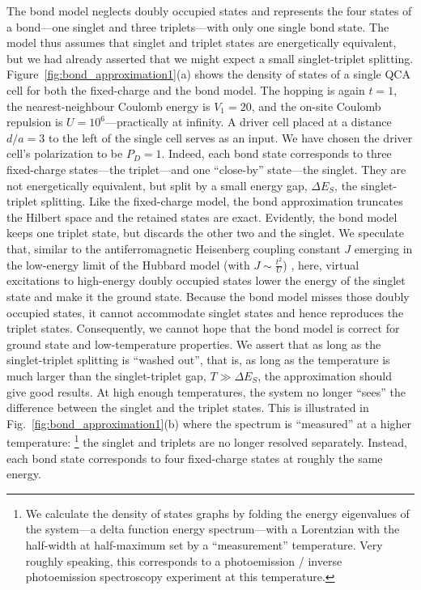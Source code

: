 The bond model neglects doubly occupied states and represents the four states of
a bond---one singlet and three triplets---with only one single bond state. The
model thus assumes that singlet and triplet states are energetically equivalent,
but we had already asserted that we might expect a small singlet-triplet
splitting. Figure~\ref{fig:bond_approximation1}(a) shows the density of states of
a single QCA cell for both the fixed-charge and the bond model. The hopping is
again $t=1$, the nearest-neighbour Coulomb energy is $V_1 = 20$, and the on-site
Coulomb repulsion is $U = 10^6$---practically at infinity. A driver cell placed
at a distance $d/a = 3$ to the left of the single cell serves as an input. We have
chosen the driver cell's polarization to be $P_D = 1$. Indeed, each bond state
corresponds to three fixed-charge states---the triplet---and one ``close-by''
state---the singlet. They are not energetically equivalent, but split by a small
energy gap, $\Delta E_S$, the singlet-triplet splitting. Like the fixed-charge
model, the bond approximation truncates the Hilbert space and the retained
states are exact. Evidently, the bond model keeps one triplet state, but
discards the other two and the singlet. We speculate that, similar to the
antiferromagnetic Heisenberg coupling constant $J$ emerging in the low-energy
limit of the Hubbard model (with $J \sim \frac{t^2}{U}$) \cite{Auerbach}, here,
virtual excitations to high-energy doubly occupied states lower the energy of
the singlet state and make it the ground state. Because the bond model misses
those doubly occupied states, it cannot accommodate singlet states and hence
reproduces the triplet states. Consequently, we cannot hope that the bond model
is correct for ground state and low-temperature properties. We assert that as
long as the singlet-triplet splitting is ``washed out'', that is, as long as the
temperature is much larger than the singlet-triplet gap, $T \gg \Delta E_S$, the
approximation should give good results. At high enough temperatures, the system
no longer ``sees'' the difference between the singlet and the triplet states.
This is illustrated in Fig.~\ref{fig:bond_approximation1}(b) where the spectrum
is ``measured'' at a higher temperature:%
%
\footnote{
We calculate the density of states graphs by folding the energy
eigenvalues of the system---a delta function energy spectrum---with a Lorentzian
with the half-width at half-maximum set by a ``measurement'' temperature. Very
roughly speaking, this corresponds to a photoemission / inverse photoemission
spectroscopy experiment at this temperature.
}%
%
the singlet and triplets are no longer resolved separately. Instead, each bond
state corresponds to four fixed-charge states at roughly the same energy.

